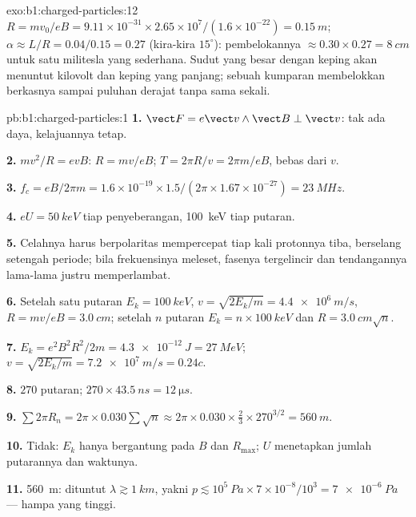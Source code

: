 \begin{solution}{exo:b1:charged-particles:12}
$R = mv_0/eB = 9.11\times10^{-31} \times 2.65\times10^7/(1.6\times10^{-22}) =
\qty{0.15}{m}$; $\alpha \approx L/R = 0.04/0.15 = 0.27$ (kira-kira $15^\circ$):
pembelokannya $\approx 0.30 \times 0.27 = \qty{8}{cm}$ untuk satu militesla
yang sederhana. Sudut yang besar dengan keping akan menuntut kilovolt dan
keping yang panjang; sebuah kumparan membelokkan berkasnya sampai puluhan
derajat tanpa  sama sekali.
\end{solution}

\begin{solution}{pb:b1:charged-particles:1}
\textbf{1.} $\vect F = e\vect v\wedge\vect B \perp \vect v$: tak ada daya, kelajuannya
tetap.

\textbf{2.} $mv^2/R = evB$: $R = mv/eB$; $T = 2\pi R/v = 2\pi m/eB$, bebas dari
$v$.

\textbf{3.} $f_c = eB/2\pi m = 1.6\times10^{-19} \times 1.5/(2\pi \times 1.67
\times10^{-27}) = \qty{23}{MHz}$.

\textbf{4.} $eU = \qty{50}{keV}$ tiap penyeberangan, \qty{100}{keV} tiap putaran.

\textbf{5.} Celahnya harus berpolaritas mempercepat tiap kali protonnya
tiba, berselang setengah periode; bila frekuensinya meleset, fasenya
tergelincir dan tendangannya lama-lama justru memperlambat.

\textbf{6.} Setelah satu putaran $E_k = \qty{100}{keV}$, $v = \sqrt{2E_k/m} =
\qty{4.4e6}{m/s}$, $R = mv/eB = \qty{3.0}{cm}$; setelah $n$ putaran $E_k =
n \times \qty{100}{keV}$ dan $R = \qty{3.0}{cm}\sqrt n$.

\textbf{7.} $E_k = e^2B^2R^2/2m = \qty{4.3e-12}{J} = \qty{27}{MeV}$; $v =
\sqrt{2E_k/m} = \qty{7.2e7}{m/s} = 0.24c$.

\textbf{8.} $270$ putaran; $270 \times \qty{43.5}{ns} = \qty{12}{\micro s}$.

\textbf{9.} $\sum 2\pi R_n = 2\pi \times 0.030\sum\sqrt n \approx 2\pi \times 0.030
\times \tfrac23 \times 270^{3/2} = \qty{560}{m}$.

\textbf{10.} Tidak: $E_k$ hanya bergantung pada $B$ dan $R_{\max}$; $U$ menetapkan
jumlah putarannya dan waktunya.

\textbf{11.}  \qty{560}{m}: dituntut $\lambda \gtrsim \qty{1}{km}$, yakni
$p \lesssim 10^5\ \unit{Pa} \times 7\times10^{-8}/10^3 = \qty{7e-6}{Pa}$ ---
hampa yang tinggi.


\end{solution}
